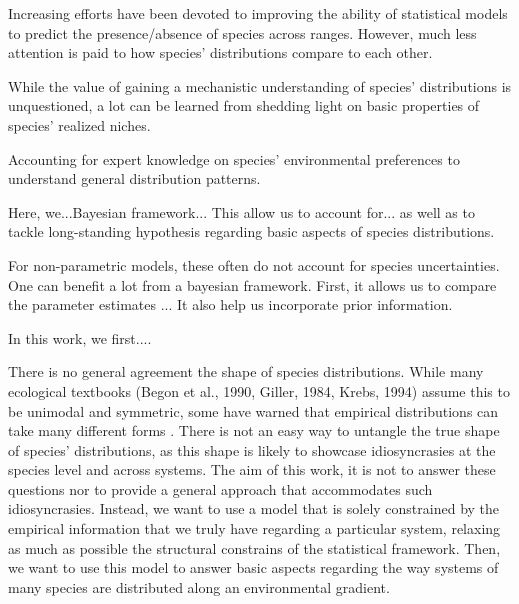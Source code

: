 \documentclass[11pt, a4paper]{article}
\begin{document}
Increasing efforts have been devoted to improving the ability of statistical models to predict the presence/absence of species across ranges. However, much less attention is paid to how species' distributions compare to each other. 


While the value of gaining a mechanistic understanding of species' distributions is unquestioned, a lot can be learned from shedding light on basic properties of species' realized niches.

Accounting for expert knowledge on species' environmental preferences to understand general distribution patterns.

Here, we...Bayesian framework... This allow us to account for... as well as to tackle long-standing hypothesis regarding basic aspects of species distributions. 

 For non-parametric models, these often do not account for species uncertainties. One can benefit a lot from a bayesian framework. First, it allows us to compare the parameter estimates ... It also help us incorporate prior information.

 
 
In this work, we first....


There is no general agreement the shape of species distributions. While many ecological textbooks (Begon et al., 1990, Giller, 1984, Krebs, 1994) assume this to be unimodal and symmetric, some have warned that empirical distributions can take many different forms \citep{austin2002spatial}. There is not an easy way to untangle the true shape of species' distributions, as this shape is likely to showcase idiosyncrasies at the species level and across systems. The aim of this work, it is not to answer these questions nor to provide a general approach that accommodates such idiosyncrasies. Instead, we want to use a model that is solely constrained by the empirical information that we truly have regarding a particular system, relaxing as much as possible the structural constrains of the statistical framework. Then, we want to use this model to answer basic aspects regarding the way systems of many species are distributed along an environmental gradient. 
\end{document}
